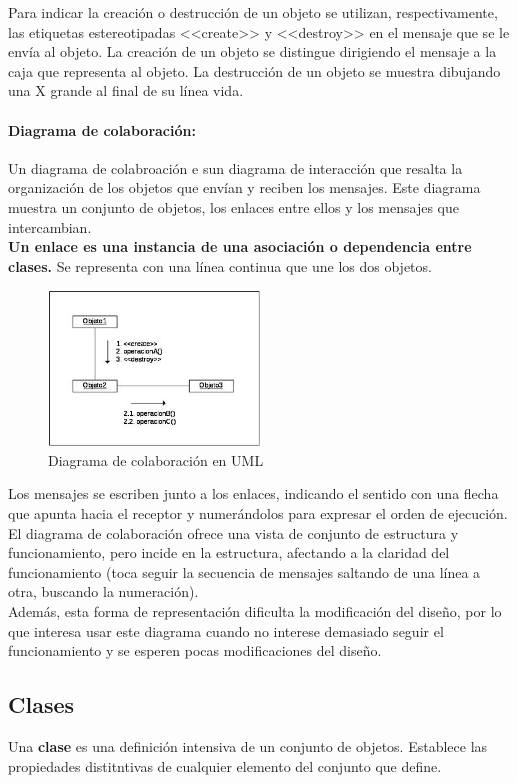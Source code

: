 Para indicar la creación o destrucción de un objeto se utilizan,
respectivamente, las etiquetas estereotipadas \textrm{<<create>>} y
\textrm{<<destroy>>} en el mensaje que se le envía al objeto. La
creación de un objeto se distingue dirigiendo el mensaje a la caja que
representa al objeto. La destrucción de un objeto se muestra dibujando
una X grande al final de su línea vida.
\newpage
\paragraph{Diagrama de colaboración:}
Un diagrama de colabroación e sun diagrama de interacción que resalta
la organización de los objetos que envían y reciben los mensajes. Este
diagrama muestra un conjunto de objetos, los enlaces entre ellos y los
mensajes que intercambian.\\
\textbf{Un enlace es una instancia de una asociación o dependencia entre
  clases.} Se representa con una línea continua que une los dos
objetos.

\begin{figure}[ht!]  \centering
  \includegraphics[width=0.5\textwidth]{images/fig25}
  \caption{Diagrama de colaboración en UML}
  \label{fig:25}
\end{figure}

Los mensajes se escriben junto a los enlaces, indicando el sentido con
una flecha que apunta hacia el receptor y numerándolos para expresar
el orden de ejecución. \\
El diagrama de colaboración ofrece una vista de conjunto de estructura
y funcionamiento, pero incide en la estructura, afectando a la
claridad del funcionamiento (toca seguir la secuencia de mensajes
saltando de una línea a otra, buscando la numeración).\\
Además, esta forma de representación dificulta la modificación del
diseño, por lo que interesa usar este diagrama cuando no interese
demasiado seguir el funcionamiento y se esperen pocas modificaciones
del diseño.

\subsection{Clases}
Una \textbf{clase} es una definición intensiva de un conjunto de
objetos. Establece las propiedades distitntivas de cualquier elemento
del conjunto que define.\\

